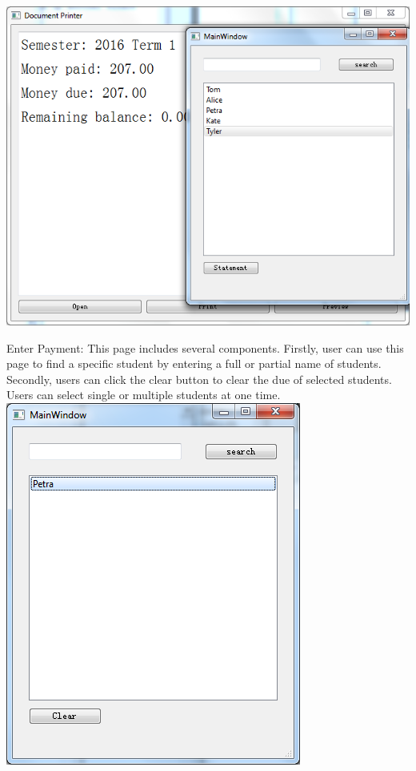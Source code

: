 \includegraphics[scale=0.5]{invoice.png}

Enter Payment:
This page includes several components. Firstly, user can use this page to find a specific student by entering a full or partial name of students. Secondly, users can click the clear button to clear the due of selected students. Users can select single or multiple students at one time.\\

\includegraphics[scale=0.5]{enterPayment.png}

